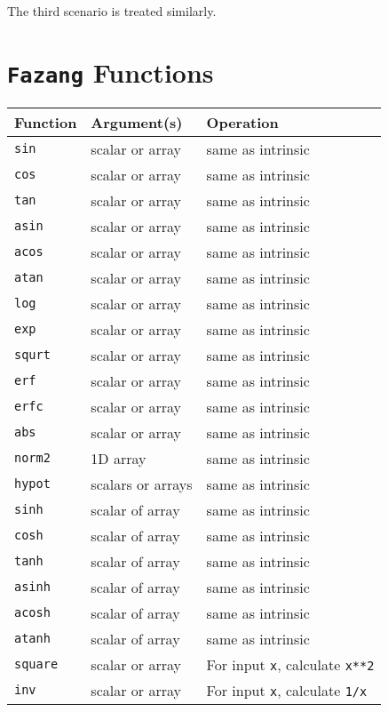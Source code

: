 \documentclass[12pt, reqno, oneside]{amsbook}
\begin{document}
The third scenario is treated similarly.

\appendix
\chapter{\texttt{Fazang} Functions \label{sec:func_list}}
\label{sec:orgec05bfd}
\label{appendix:func}  
\begin{center}
\begin{tabular}{lll}
Function & Argument(s) & Operation\\
\hline
\texttt{sin} & scalar or array & same as intrinsic\\
\texttt{cos} & scalar or array & same as intrinsic\\
\texttt{tan} & scalar or array & same as intrinsic\\
\texttt{asin} & scalar or array & same as intrinsic\\
\texttt{acos} & scalar or array & same as intrinsic\\
\texttt{atan} & scalar or array & same as intrinsic\\
\texttt{log} & scalar or array & same as intrinsic\\
\texttt{exp} & scalar or array & same as intrinsic\\
\texttt{squrt} & scalar or array & same as intrinsic\\
\texttt{erf} & scalar or array & same as intrinsic\\
\texttt{erfc} & scalar or array & same as intrinsic\\
\texttt{abs} & scalar or array & same as intrinsic\\
\texttt{norm2} & 1D array & same as intrinsic\\
\texttt{hypot} & scalars or arrays & same as intrinsic\\
\texttt{sinh} & scalar of array & same as intrinsic\\
\texttt{cosh} & scalar of array & same as intrinsic\\
\texttt{tanh} & scalar of array & same as intrinsic\\
\texttt{asinh} & scalar of array & same as intrinsic\\
\texttt{acosh} & scalar of array & same as intrinsic\\
\texttt{atanh} & scalar of array & same as intrinsic\\
\texttt{square} & scalar or array & For input \texttt{x}, calculate \texttt{x**2}\\
\texttt{inv} & scalar or array & For input \texttt{x}, calculate \texttt{1/x}\\

\end{tabular}
\end{center}
\end{document}
